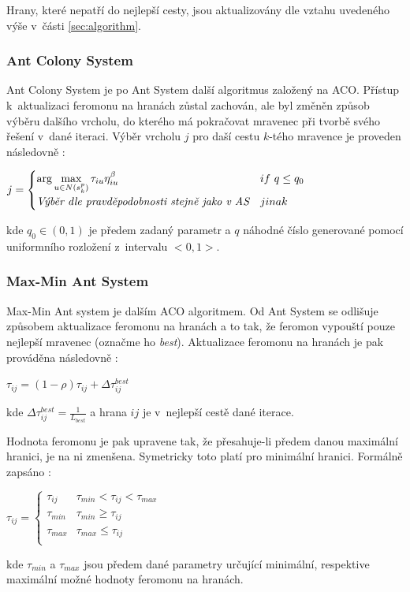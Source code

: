 \documentclass[a4paper, 12pt]{article}
\begin{document}
Hrany, které nepatří do nejlepší cesty, jsou aktualizovány dle vztahu uvedeného výše v~části \ref{sec:algorithm}.

\subsubsection{Ant Colony System}
Ant Colony System je po Ant System další algoritmus založený na ACO. Přístup k~aktualizaci feromonu na hranách zůstal zachován, ale byl změněn způsob
výběru dalšího vrcholu, do kterého má pokračovat mravenec při tvorbě svého řešení v~dané iteraci. Výběr vrcholu $j$ pro daší cestu $k$-tého mravence
je proveden následovně \cite{aco:acs}:
\begin{center}
  $j = 
  \begin{cases}
    \arg\max\limits_{u\in N(s^p_k)}\tau_{iu}\eta^{\beta}_{iu} & if\ q\leq q_0\\
    \emph{Výběr dle pravděpodobnosti stejně jako v~AS} & jinak
   \end{cases}
   $
\end{center}
kde $q_0\in (0,1)$ je předem zadaný parametr a $q$ náhodné číslo generované pomocí uniformního rozložení z~intervalu $<0,1>$.

\subsubsection{Max-Min Ant System}
Max-Min Ant system je dalším ACO algoritmem. Od Ant System se odlišuje způsobem aktualizace feromonu na hranách a to tak, že feromon vypouští pouze
nejlepší mravenec (označme ho \emph{best}). Aktualizace feromonu na hranách je pak prováděna následovně \cite{aco:maxmin}:
\begin{center}
  $\tau_{ij}=(1-\rho)\tau_{ij}+\Delta\tau_{ij}^{best}$
\end{center}
kde $\Delta\tau_{ij}^{best}=\frac{1}{L_{best}}$ a hrana $ij$ je v~nejlepší cestě dané iterace.

Hodnota feromonu je pak upravene tak, že přesahuje-li předem danou maximální hranici, je na ni zmenšena. Symetricky toto platí pro minimální hranici. Formálně
zapsáno \cite{aco:maxmin}:
\begin{center}
  $\tau_{ij} = 
  \begin{cases}
    \tau_{ij} & \tau_{min} < \tau_{ij} < \tau_{max}\\
    \tau_{min} & \tau_{min} \geq \tau_{ij}\\
    \tau_{max} & \tau_{max} \leq \tau_{ij}\\
   \end{cases}
   $
\end{center}
kde $\tau_{min}$ a $\tau_{max}$ jsou předem dané parametry určující minimální, respektive maximální možné hodnoty feromonu na hranách.
\end{document}
